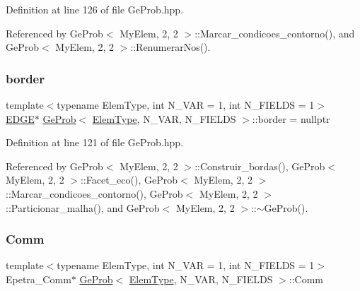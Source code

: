 Definition at line 126 of file Ge\+Prob.\+hpp.



Referenced by Ge\+Prob$<$ My\+Elem, 2, 2 $>$\+::\+Marcar\+\_\+condicoes\+\_\+contorno(), and Ge\+Prob$<$ My\+Elem, 2, 2 $>$\+::\+Renumerar\+Nos().

\mbox{\label{classGeProb_a6c144ac05b601c5d6141c711edaaa775}} 
\subsubsection{\texorpdfstring{border}{border}}
{\footnotesize\ttfamily template$<$typename Elem\+Type, int N\+\_\+\+V\+AR = 1, int N\+\_\+\+F\+I\+E\+L\+DS = 1$>$ \\
\hyperlink{structEDGE}{E\+D\+GE}$\ast$ \hyperlink{classGeProb}{Ge\+Prob}$<$ \hyperlink{spectral_8h_aaa2c1a7b2d1b12c590d730fe6ac839fa}{Elem\+Type}, N\+\_\+\+V\+AR, N\+\_\+\+F\+I\+E\+L\+DS $>$\+::border = nullptr\hspace{0.3cm}{\ttfamily [protected]}}



Definition at line 121 of file Ge\+Prob.\+hpp.



Referenced by Ge\+Prob$<$ My\+Elem, 2, 2 $>$\+::\+Construir\+\_\+bordas(), Ge\+Prob$<$ My\+Elem, 2, 2 $>$\+::\+Facet\+\_\+eco(), Ge\+Prob$<$ My\+Elem, 2, 2 $>$\+::\+Marcar\+\_\+condicoes\+\_\+contorno(), Ge\+Prob$<$ My\+Elem, 2, 2 $>$\+::\+Particionar\+\_\+malha(), and Ge\+Prob$<$ My\+Elem, 2, 2 $>$\+::$\sim$\+Ge\+Prob().

\mbox{\label{classGeProb_a28a1d41fc8c294fe629b95901df8f4e3}} 
\subsubsection{\texorpdfstring{Comm}{Comm}}
{\footnotesize\ttfamily template$<$typename Elem\+Type, int N\+\_\+\+V\+AR = 1, int N\+\_\+\+F\+I\+E\+L\+DS = 1$>$ \\
Epetra\+\_\+\+Comm$\ast$ \hyperlink{classGeProb}{Ge\+Prob}$<$ \hyperlink{spectral_8h_aaa2c1a7b2d1b12c590d730fe6ac839fa}{Elem\+Type}, N\+\_\+\+V\+AR, N\+\_\+\+F\+I\+E\+L\+DS $>$\+::Comm\hspace{0.3cm}{\ttfamily [protected]}}



